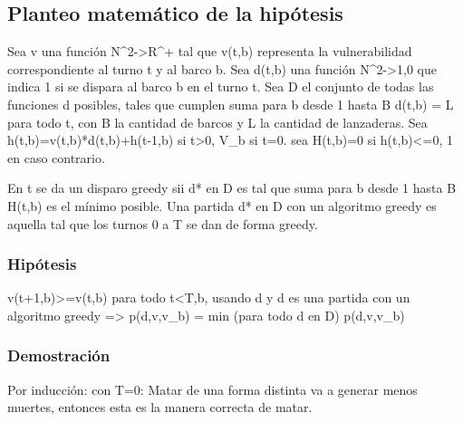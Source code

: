 \subsection{Planteo matemático de la hipótesis}

Sea v una función N^2->R^+ tal que v(t,b) representa la vulnerabilidad correspondiente al turno t y al barco b. Sea d(t,b) una función N^2->{1,0} que indica 1 si se dispara al barco b en el turno t. Sea D el conjunto de todas las funciones d posibles, tales que cumplen suma para b desde 1 hasta B d(t,b) = L para todo t, con B la cantidad de barcos y L la cantidad de lanzaderas. Sea h(t,b)=v(t,b)*d(t,b)+h(t-1,b) si t>0, V_b si t=0. sea H(t,b)=0 si h(t,b)<=0, 1 en caso contrario.

En t se da un disparo greedy sii d* en D es tal que suma para b desde 1 hasta B H(t,b) es el mínimo posible.
Una partida d* en D con un algoritmo greedy es aquella tal que los turnos 0 a T se dan de forma greedy.

\subsubsection{Hipótesis}
v(t+1,b)>=v(t,b) para todo t<T,b, usando d y d es una partida con un algoritmo greedy => p(d,v,v_b) = min (para todo d en D) {p(d,v,v_b)} 

\subsubsection{Demostración}
Por inducción:
con T=0:
Matar de una forma distinta va a generar menos muertes, entonces esta es la manera correcta de matar.

